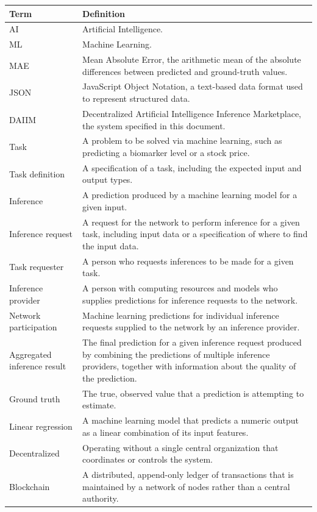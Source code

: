 \documentclass[12pt]{article}
\begin{document}
\begin{longtable}{p{} p{}}
\toprule
Term & Definition\\
\midrule
AI & Artificial Intelligence.\\
ML & Machine Learning.\\
MAE & Mean Absolute Error, the arithmetic mean of the absolute differences between predicted and ground-truth values.\\
JSON & JavaScript Object Notation, a text-based data format used to represent structured data.\\
DAIIM & Decentralized Artificial Intelligence Inference Marketplace, the system specified in this document.\\
Task & A problem to be solved via machine learning, such as predicting a biomarker level or a stock price.\\
Task definition & A specification of a task, including the expected input and output types.\\
Inference & A prediction produced by a machine learning model for a given input.\\
Inference request & A request for the network to perform inference for a given task, including input data or a specification of where to find the input data.\\
Task requester & A person who requests inferences to be made for a given task.\\
Inference provider & A person with computing resources and models who supplies predictions for inference requests to the network.\\
Network participation & Machine learning predictions for individual inference requests supplied to the network by an inference provider.\\
Aggregated inference result & The final prediction for a given inference request produced by combining the predictions of multiple inference providers, together with information about the quality of the prediction.\\
Ground truth & The true, observed value that a prediction is attempting to estimate.\\
Linear regression & A machine learning model that predicts a numeric output as a linear combination of its input features.\\
Decentralized & Operating without a single central organization that coordinates or controls the system.\\
Blockchain & A distributed, append-only ledger of transactions that is maintained by a network of nodes rather than a central authority.\\

\end{longtable}
\end{document}
